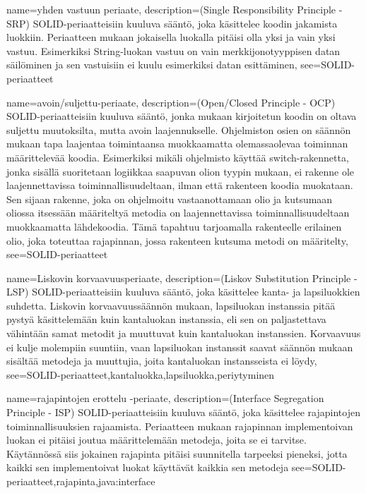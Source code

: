 {
	name=yhden vastuun periaate,
	description={(Single Responsibility Principle - SRP) SOLID-periaatteisiin kuuluva sääntö, joka
käsittelee koodin jakamista luokkiin. Periaatteen mukaan jokaisella luokalla pitäisi olla yksi ja
vain yksi vastuu. Esimerkiksi String-luokan vastuu on vain merkkijonotyyppisen datan säilöminen ja
sen vastuisiin ei kuulu esimerkiksi datan esittäminen},
	see={SOLID-periaatteet}
}

{
	name=avoin/suljettu-periaate,
	description={(Open/Closed Principle - OCP) SOLID-periaatteisiin kuuluva sääntö, jonka mukaan
kirjoitetun koodin on oltava suljettu muutoksilta, mutta avoin laajennukselle. Ohjelmiston osien
on säännön mukaan tapa laajentaa toimintaansa muokkaamatta olemassaolevaa toiminnan määrittelevää
koodia. Esimerkiksi mikäli ohjelmisto käyttää switch-rakennetta, jonka sisällä suoritetaan
logiikkaa saapuvan olion tyypin mukaan, ei rakenne ole laajennettavissa toiminnallisuudeltaan,
ilman että rakenteen koodia muokataan. Sen sijaan rakenne, joka on ohjelmoitu vastaanottamaan
olio ja kutsumaan oliossa itsessään määriteltyä metodia on laajennettavissa toiminnallisuudeltaan
muokkaamatta lähdekoodia. Tämä tapahtuu tarjoamalla rakenteelle erilainen olio, joka toteuttaa
rajapinnan, jossa rakenteen kutsuma metodi on määritelty},
	see={SOLID-periaatteet}
}

{
	name=Liskovin korvaavuusperiaate,
	description={(Liskov Substitution Principle - LSP) SOLID-periaatteisiin kuuluva sääntö, joka
käsittelee kanta- ja lapsiluokkien suhdetta. Liskovin korvaavuussäännön mukaan, lapsiluokan
instanssia pitää pystyä käsittelemään kuin kantaluokan instanssia, eli sen on paljastettava
vähintään samat metodit ja muuttuvat kuin kantaluokan instanssien. Korvaavuus ei kulje molempiin
suuntiin, vaan lapsiluokan instanssit saavat säännön mukaan sisältää metodeja ja muuttujia, joita
kantaluokan instansseista ei löydy},
	see={SOLID-periaatteet,kantaluokka,lapsiluokka,periytyminen}
}

{
	name=rajapintojen erottelu -periaate,
	description={(Interface Segregation Principle - ISP) SOLID-periaatteisiin kuuluva sääntö, joka
käsittelee rajapintojen toiminnallisuuksien rajaamista. Periaatteen mukaan rajapinnan
implementoivan luokan ei pitäisi joutua määrittelemään metodeja, joita se ei tarvitse. Käytännössä
siis jokainen rajapinta pitäisi suunnitella tarpeeksi pieneksi, jotta kaikki sen implementoivat
luokat käyttävät kaikkia sen metodeja}
	see={SOLID-periaatteet,rajapinta,java:interface}
}

